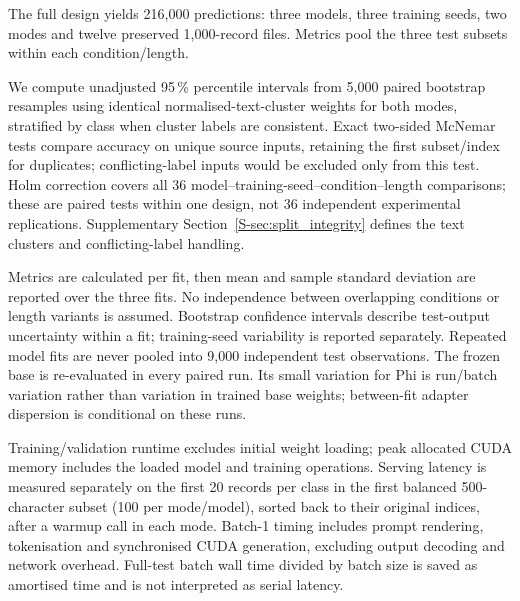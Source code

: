 The full design yields 216,000 predictions: three models, three training
seeds, two modes and twelve preserved 1,000-record files. Metrics pool the three test subsets
within each condition/length.

We compute unadjusted 95\,\% percentile
intervals from 5,000 paired bootstrap resamples
using identical normalised-text-cluster weights for both modes,
stratified by class when cluster labels are consistent. Exact two-sided
McNemar tests compare accuracy on unique source inputs, retaining the
first subset/index for duplicates; conflicting-label inputs would be
excluded only from this test. Holm correction covers all 36 model--training-seed--condition--length
comparisons; these are paired tests within one design, not 36 independent
experimental replications. Supplementary Section~\ref{S-sec:split_integrity}
defines the text clusters and conflicting-label handling.

Metrics are calculated per fit, then mean and sample
standard deviation are reported over the three fits. No independence between
overlapping conditions or length variants is assumed. Bootstrap confidence intervals describe test-output uncertainty within
a fit; training-seed variability is reported separately. Repeated model
fits are never pooled into 9,000 independent test observations.
The frozen base is re-evaluated in every paired run. Its small variation
for Phi is run/batch variation rather than variation in trained base
weights; between-fit adapter dispersion is conditional on these runs.

Training/validation runtime excludes initial weight loading; peak
allocated CUDA memory includes the loaded model and training operations.
Serving latency is measured separately on the first 20 records per
class in the first balanced 500-character subset (100 per mode/model),
sorted back to their original indices, after a warmup call in each mode.
Batch-1 timing includes prompt rendering, tokenisation and synchronised
CUDA generation, excluding output decoding and network overhead.
Full-test batch wall time divided by batch size is saved as amortised
time and is not interpreted as serial latency.
